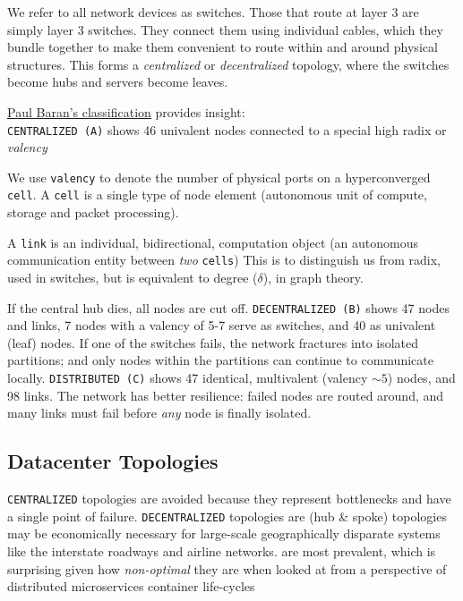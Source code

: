 We refer to all network devices as switches. Those that route at layer 3 are simply layer 3 switches.
They connect them using individual cables, which they bundle together to make them convenient to route within and around physical structures. This forms a \emph{centralized} or \emph{decentralized}%
 topology, where the switches become hubs and servers become leaves.
 
\noindent \href{http://www.rand.org/about/history/baran.html}{Paul Baran's classification} %
provides insight:\\ \texttt{CENTRALIZED (A)} shows 46 univalent nodes connected to a %
special high radix or \emph{valency}

We use \texttt{valency} to denote the number of physical ports on a hyperconverged \texttt{cell}. A \texttt{cell} is a single type of node element (autonomous unit of compute, storage and packet processing). 

A \texttt{link} is an individual, bidirectional, computation object (an autonomous communication entity between  \emph{two} \texttt{cells}) This is to distinguish us from radix, used in switches, but is equivalent to degree ($\delta$), in graph theory.

If the central hub dies, all nodes are cut off.  \texttt{DECENTRALIZED (B)} shows 47 nodes and links, 7 nodes with a valency of  5-7 serve as switches, and 40 as univalent (leaf) nodes. If one of the switches fails, the network fractures into isolated partitions; and only nodes within the partitions can continue to communicate locally. \texttt{DISTRIBUTED (C)} shows 47 identical, multivalent (valency $\sim5$) nodes, and 98 links. The network has better resilience:  failed nodes are routed around, and many links must fail before \emph{any} node is finally isolated.

\subsection*{Datacenter Topologies}
\texttt{CENTRALIZED} topologies are avoided because they represent bottlenecks and have a single point of failure. %
\texttt{DECENTRALIZED} topologies are (hub \& spoke) topologies may be economically necessary for large-scale geographically disparate systems like the interstate roadways and airline networks. are  
most prevalent,  which is surprising given how \emph{non-optimal} they are  when looked at
from a perspective of distributed microservices container life-cycles


